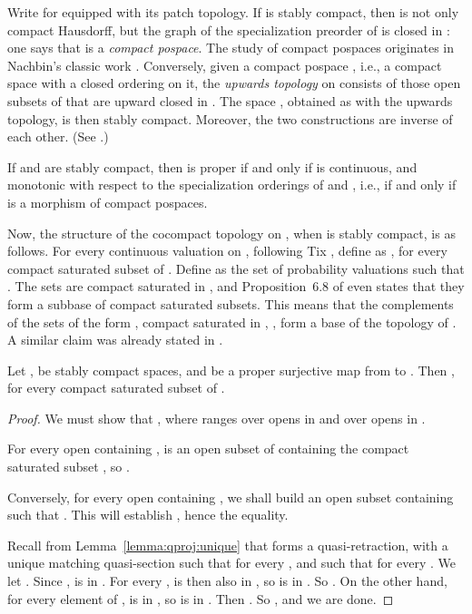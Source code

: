 \documentclass{LMCS}
\begin{document}
Write  for  equipped with its patch topology.  If  is
stably compact, then  is not only compact Hausdorff, but the
graph of the specialization preorder  of  is closed in
: one says that  is a \emph{compact
  pospace}.  The study of compact pospaces originates in Nachbin's
classic work \cite{Nachbin:toporder}.  Conversely, given a compact
pospace , i.e., a compact space with a closed ordering
 on it, the \emph{upwards topology} on  consists of those
open subsets of  that are upward closed in .  The space
, obtained as  with the upwards topology, is then
stably compact.  Moreover, the two constructions are inverse of each
other.  (See \cite[Section~VI-6]{GHKLMS:contlatt}.)

If  and  are stably compact, then  is proper if and
only if  is continuous, and monotonic with
respect to the specialization orderings of  and 
\cite[Proposition~VI.6.23]{GHKLMS:contlatt}, i.e., if and only if 
is a morphism of compact pospaces.

Now, the structure of the cocompact topology on ,
when  is stably compact, is as follows.  For every continuous
valuation  on , following Tix \cite{Tix:bewertung}, define
 as ,
for every compact saturated subset  of .
Define  as the set of probability valuations
 such that .  The sets  are compact saturated in , and
Proposition~6.8 of \cite{JGL-mscs09} even states that they form a
subbase of compact saturated subsets.  This means that the complements
of the sets of the form ,  compact
saturated in , , form a base of the topology of
.  A similar claim was already stated in
\cite[last lines]{Jung:scs:prob}.

\begin{lem}
  \label{lemma:Vf:dagger}
  Let ,  be stably compact spaces, and  be a proper
  surjective map from  to .  Then , for every compact
  saturated subset  of .
\end{lem}
\begin{proof}
  We must show that , where  ranges over opens in 
  and  over opens in .

  For every open  containing ,  is an open
  subset of  containing the compact saturated subset ,
  so .

  Conversely, for every open  containing , we shall
  build an open subset  containing  such that .  This will establish , hence the
  equality.

  Recall from Lemma~\ref{lemma:qproj:unique} that  forms a
  quasi-retraction, with a unique matching quasi-section  such that  for every , and such
  that  for every .  We let .  Since ,  is
  in .  For every ,  is then also in , so  is in
  .  So .  On the other hand,
  for every element  of ,  is in , so  is in .  Then .  So , and we are done.
\end{proof}
\end{document}
